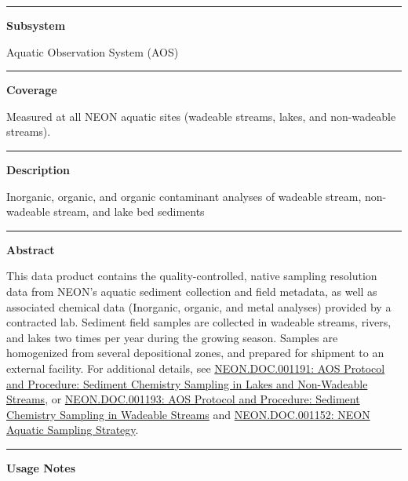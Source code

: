 \documentclass[]{article}
\begin{document}
\begin{center}\rule{0.5\linewidth}{\linethickness}\end{center}

\textbf{Subsystem}

Aquatic Observation System (AOS)

\begin{center}\rule{0.5\linewidth}{\linethickness}\end{center}

\textbf{Coverage}

Measured at all NEON aquatic sites (wadeable streams, lakes, and
non-wadeable streams).

\begin{center}\rule{0.5\linewidth}{\linethickness}\end{center}

\textbf{Description}

Inorganic, organic, and organic contaminant analyses of wadeable stream,
non-wadeable stream, and lake bed sediments

\begin{center}\rule{0.5\linewidth}{\linethickness}\end{center}

\textbf{Abstract}

This data product contains the quality-controlled, native sampling
resolution data from NEON's aquatic sediment collection and field
metadata, as well as associated chemical data (Inorganic, organic, and
metal analyses) provided by a contracted lab. Sediment field samples are
collected in wadeable streams, rivers, and lakes two times per year
during the growing season. Samples are homogenized from several
depositional zones, and prepared for shipment to an external facility.
For additional details, see
\href{http://data.neonscience.org/api/v0/documents/NEON.DOC.001191vD}{NEON.DOC.001191:
AOS Protocol and Procedure: Sediment Chemistry Sampling in Lakes and
Non-Wadeable Streams}, or
\href{http://data.neonscience.org/api/v0/documents/NEON.DOC.001193vE}{NEON.DOC.001193:
AOS Protocol and Procedure: Sediment Chemistry Sampling in Wadeable
Streams} and
\href{http://data.neonscience.org/api/v0/documents/NEON.DOC.001152vA}{NEON.DOC.001152:
NEON Aquatic Sampling Strategy}.

\begin{center}\rule{0.5\linewidth}{\linethickness}\end{center}

\textbf{Usage Notes}
\end{document}
